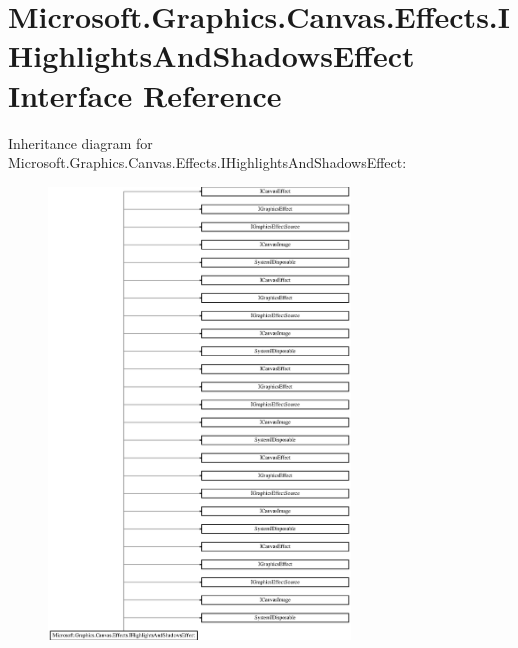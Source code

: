 \hypertarget{interface_microsoft_1_1_graphics_1_1_canvas_1_1_effects_1_1_i_highlights_and_shadows_effect}{}\section{Microsoft.\+Graphics.\+Canvas.\+Effects.\+I\+Highlights\+And\+Shadows\+Effect Interface Reference}
\label{interface_microsoft_1_1_graphics_1_1_canvas_1_1_effects_1_1_i_highlights_and_shadows_effect}
Inheritance diagram for Microsoft.\+Graphics.\+Canvas.\+Effects.\+I\+Highlights\+And\+Shadows\+Effect\+:\begin{figure}[H]
\begin{center}
\leavevmode
\includegraphics[height=12.000000cm]{interface_microsoft_1_1_graphics_1_1_canvas_1_1_effects_1_1_i_highlights_and_shadows_effect}
\end{center}
\end{figure}

